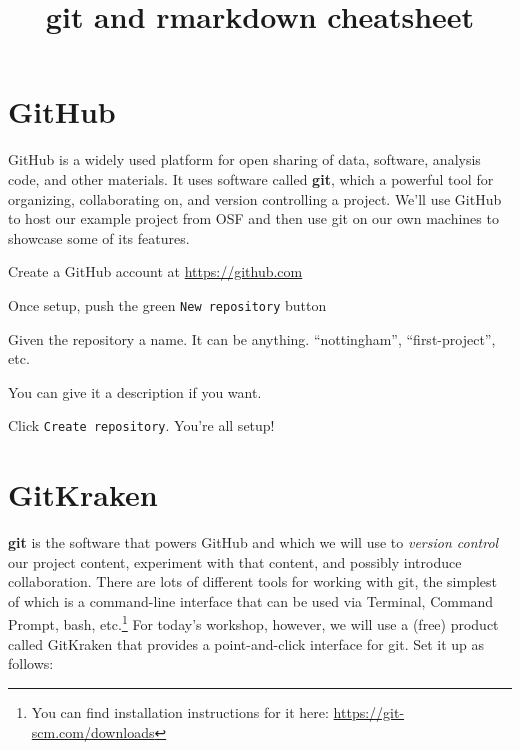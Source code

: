 \documentclass[12pt, a4paper]{article}
\title{git and rmarkdown cheatsheet}
\date{}
\begin{document}
\vspace{-4em}

\maketitle

\vspace{-3em}

\section{GitHub}

GitHub is a widely used platform for open sharing of data, software, analysis code, and other materials. It uses software called \textbf{git}, which a powerful tool for organizing, collaborating on, and version controlling a project. We'll use GitHub to host our example project from OSF and then use git on our own machines to showcase some of its features.

\begin{enumerate*}
\item Create a GitHub account at \url{https://github.com}
\item Once setup, push the green \texttt{New repository} button
\item Given the repository a name. It can be anything. ``nottingham'', ``first-project'', etc.
\item You can give it a description if you want.
\item Click \texttt{Create repository}. You're all setup!
\end{enumerate*}

\section{GitKraken}

\textbf{git} is the software that powers GitHub and which we will use to \textit{version control} our project content, experiment with that content, and possibly introduce collaboration. There are lots of different tools for working with git, the simplest of which is a command-line interface that can be used via Terminal, Command Prompt, bash, etc.\footnote{You can find installation instructions for it here: \url{https://git-scm.com/downloads}} For today's workshop, however, we will use a (free) product called GitKraken that provides a point-and-click interface for git. Set it up as follows:
\end{document}
